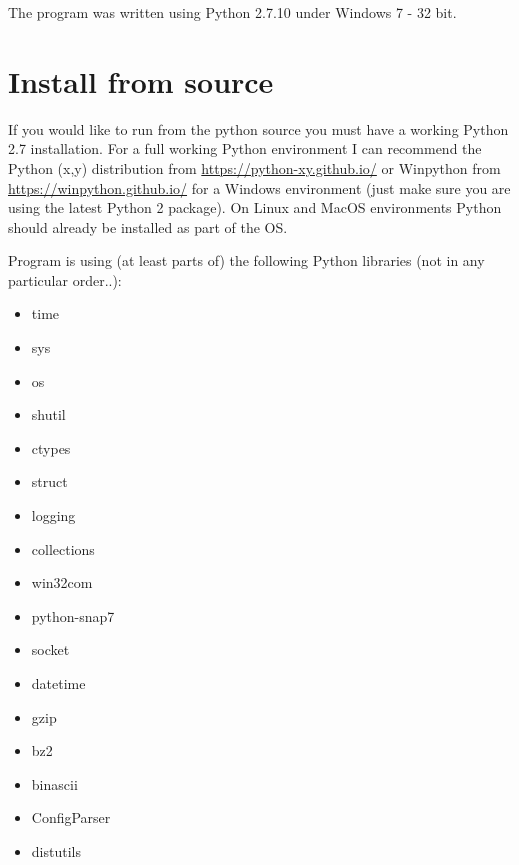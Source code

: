 \documentclass[a4paper,10pt,english]{sphinxmanual}
\begin{document}
The program was written using Python 2.7.10 under Windows 7 - 32 bit.


\section{Install from source}
\label{installation:install-from-source}
If you would like to run from the python source you must have a working Python 2.7 installation. For a full working Python environment I can recommend the Python (x,y) distribution from \href{https://python-xy.github.io/}{https://python-xy.github.io/} or Winpython from \href{https://winpython.github.io/}{https://winpython.github.io/} for a Windows environment (just make sure you are using the latest Python 2 package). On Linux and MacOS environments Python should already be installed as part of the OS.

Program is using (at least parts of) the following Python libraries (not in any particular order..):
\begin{itemize}
\item {} 
time

\item {} 
sys

\item {} 
os

\item {} 
shutil

\item {} 
ctypes

\item {} 
struct

\item {} 
logging

\item {} 
collections

\item {} 
win32com

\item {} 
python-snap7

\item {} 
socket

\item {} 
datetime

\item {} 
gzip

\item {} 
bz2

\item {} 
binascii

\item {} 
ConfigParser

\item {} 
distutils

\end{itemize}
\end{document}
